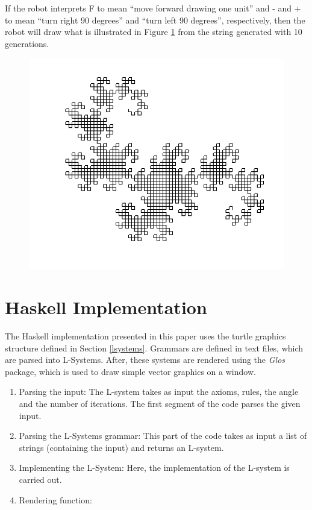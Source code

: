 \documentclass{article}
\begin{document}
If the robot interprets F to mean ``move forward drawing one unit'' and - and + to
mean ``turn right 90 degrees'' and ``turn left 90 degrees'', respectively, then the robot will
draw what is illustrated in Figure \ref{fig:example} from the string generated
with 10 generations.

\begin{figure}[!h]
\centering
\includegraphics[width=0.48 \textwidth]{Images/result4.png}
\vskip -6pt
\label{fig:example}
\end{figure}

\section{Haskell Implementation}
\label{implementation}

The Haskell implementation presented in this paper uses the turtle graphics
structure defined in Section \ref{lsystems}. Grammars are defined in text files,
which are parsed into L-Systems. After, these systems are rendered using the \textit{Glos}
package, which is used to draw simple vector graphics on a window.


\begin{enumerate}
\item Parsing the input: The L-system takes as input the axioms, rules, the angle and the number of iterations. The first segment of the code parses the given input.
\item Parsing the L-Systems grammar: This part of the code takes as input a list of strings (containing the input) and returns an L-system.
\item Implementing the L-System: Here, the implementation of the L-system is carried out.
\item Rendering function:

\end{enumerate}
\end{document}
